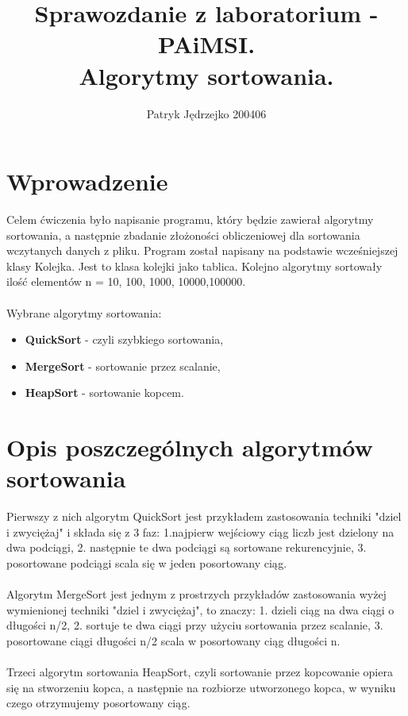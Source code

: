 \documentclass{article}
\author{Patryk Jędrzejko 200406}
\title{Sprawozdanie z laboratorium - PAiMSI. \\Algorytmy sortowania.}
\begin{document}
\maketitle

\section{Wprowadzenie}
Celem ćwiczenia było napisanie programu, który będzie zawierał algorytmy sortowania, a następnie zbadanie złożoności obliczeniowej dla sortowania wczytanych danych z pliku. Program został napisany na podstawie wcześniejszej klasy Kolejka. Jest to klasa kolejki jako tablica.
Kolejno algorytmy sortowały ilość elementów n = 10, 100, 1000, 10000,100000.
\\\\Wybrane algorytmy sortowania:
\begin{itemize}
  \item \textbf{QuickSort} - czyli szybkiego sortowania,
  \item \textbf{MergeSort} - sortowanie przez scalanie,
  \item \textbf{HeapSort} - sortowanie kopcem.
\end{itemize}
\section{Opis poszczególnych algorytmów sortowania}
Pierwszy z nich algorytm QuickSort jest przykładem zastosowania techniki "dziel i zwyciężaj" i składa się z 3 faz: 1.najpierw wejściowy ciąg liczb jest dzielony na dwa podciągi, 2. następnie te dwa podciągi są sortowane rekurencyjnie, 3. posortowane podciągi scala się w jeden posortowany ciąg.
\\\\Algorytm MergeSort jest jednym z prostrzych przykładów zastosowania wyżej wymienionej techniki "dziel i zwyciężaj", to znaczy: 1. dzieli ciąg na dwa ciągi o długości n/2, 2. sortuje te dwa ciągi przy użyciu sortowania przez scalanie, 3. posortowane ciągi długości n/2 scala w posortowany ciąg długości n.
\\\\Trzeci algorytm sortowania HeapSort, czyli sortowanie przez kopcowanie opiera się na stworzeniu kopca, a następnie na rozbiorze utworzonego kopca, w wyniku czego otrzymujemy posortowany ciąg.
\end{document}
